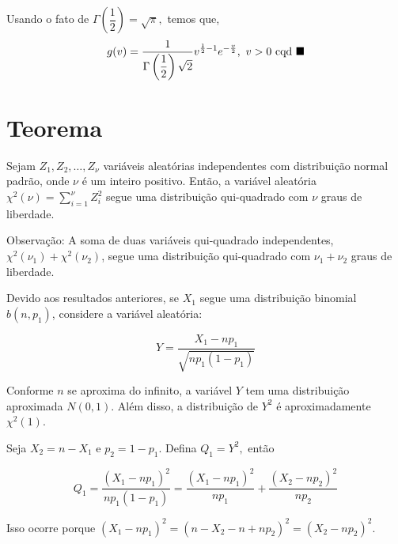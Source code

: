 \documentclass[12pt]{beamer}
\begin{document}
\begin{frame}{}
\begin{block}{}
\justifying
Usando o fato de $\Gamma\left(\dfrac{1}{2}\right)=\sqrt{\pi},$ temos que,
\begin{align*}
   g(v)=\dfrac{1}{\Gamma\left(\dfrac{1}{2}\right)\sqrt{2}}v^{\frac{1}{2}-1}e^{-\frac{v}{2}},~v>0~\text{cqd}~\blacksquare
\end{align*}

\end{block}
\end{frame}

\section{Teorema}
\begin{frame}{}
\begin{Teorema}
\justifying
Sejam $Z_1, Z_2, \ldots, Z_{\nu}$ variáveis aleatórias independentes com distribuição normal padrão, onde $\nu$ é um inteiro positivo. Então, a variável aleatória $\chi^2(\nu) = {\displaystyle \sum_{i=1}^{\nu}} Z_i^2$ segue uma distribuição qui-quadrado com $\nu$ graus de liberdade.
\end{Teorema}
\pause
\begin{block}{Observação:}
\justifying
A soma de duas variáveis qui-quadrado independentes, $\chi^2(\nu_1) + \chi^2(\nu_2)$, segue uma distribuição qui-quadrado com $\nu_1 + \nu_2$ graus de liberdade.
\end{block}
\end{frame}

\begin{frame}{}
\begin{block}{}
\justifying
Devido aos resultados anteriores, se $X_1$ segue uma distribuição binomial $b(n, p_1)$, considere a variável aleatória:

\[
Y = \frac{X_1 - np_1}{\sqrt{np_1(1 - p_1)}}
\]
\end{block}
\pause
\begin{block}{}
\justifying
Conforme $n$ se aproxima do infinito, a variável $Y$ tem uma distribuição aproximada $N(0, 1).$ Além disso, a distribuição de $Y^2$ é aproximadamente $\chi^2(1)$.
\end{block}
\end{frame}

\begin{frame}{}
\begin{block}{}
\justifying
Seja $X_2 = n - X_1$ e $p_2 = 1 - p_1$. Defina $Q_1=Y^{2},$ então

\[
Q_1 = \frac{(X_1 - np_1)^2}{np_1(1 - p_1)} = \frac{(X_1 - np_1)^2}{np_1} + \frac{(X_2 - np_2)^2}{np_2}
\]

Isso ocorre porque $(X_1 - np_1)^2 = (n - X_2 - n + np_2)^2 = (X_2 - np_2)^2$. 
\end{block}
\end{frame}
\end{document}
